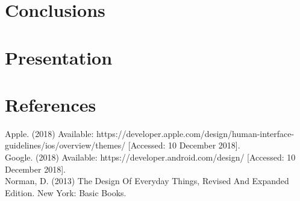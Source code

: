 \documentclass[version=last,fontsize=13pt]{scrartcl}
\begin{document}
\section{Conclusions}

\section{Presentation}

\section{References}
Apple. (2018) Available: https://developer.apple.com/design/human-interface-guidelines/ios/overview/themes/ [Accessed: 10 December 2018].\\

Google. (2018) Available: https://developer.android.com/design/ [Accessed: 10 December 2018]. \\

Norman, D. (2013) The Design Of Everyday Things, Revised And Expanded Edition. New York: Basic Books.\\
\end{document}

